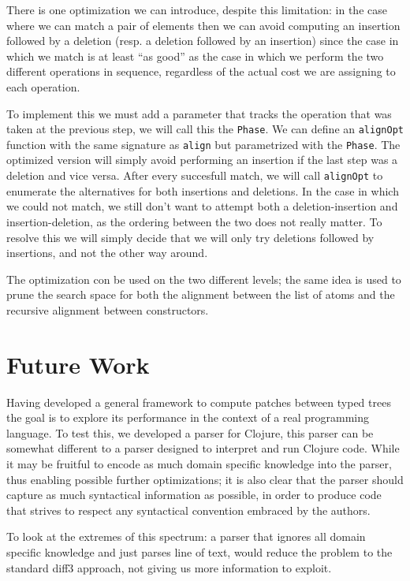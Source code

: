 \documentclass[11pt]{article}
\begin{document}
There is one optimization we can introduce, despite this limitation: in
the case where we can match a pair of elements then we can avoid
computing an insertion followed by a deletion (resp. a deletion followed
by an insertion) since the case in which we match is at least ``as
good'' as the case in which we perform the two different operations in
sequence, regardless of the actual cost we are assigning to each
operation.

To implement this we must add a parameter that tracks the operation that
was taken at the previous step, we will call this the \texttt{Phase}. We
can define an \texttt{alignOpt} function with the same signature as
\texttt{align} but parametrized with the \texttt{Phase}. The optimized
version will simply avoid performing an insertion if the last step was a
deletion and vice versa. 
After every succesfull match, we will call \texttt{alignOpt} to enumerate the alternatives for both insertions and
deletions. In the case in which we could not match, we still don't 
want to attempt both a deletion-insertion and insertion-deletion, as the 
ordering between the two does not really matter. To resolve this we will simply 
decide that we will only try deletions followed by insertions, and not the other 
way around.

The optimization con be used on the two different levels; the same idea is used to prune the search space 
for both the alignment between the list of atoms and the recursive alignment between constructors.


\section{Future Work}\label{future work}

Having developed a general framework to compute patches between typed trees the 
goal is to explore its performance in the context of a real programming 
language.
To test this, we developed a parser for Clojure, this parser can be somewhat 
different to a parser designed to interpret and run Clojure code. While it may 
be fruitful to encode as much domain specific knowledge into the parser, thus 
enabling possible further optimizations; it is also clear that the parser should 
capture as much syntactical information as possible, in order to produce code 
that strives to respect any syntactical convention embraced by the authors.

To look at the extremes of this spectrum: a parser that ignores all domain
specific knowledge and just parses line of text, would reduce the problem to the 
standard diff3 approach, not giving us more information to exploit.
\end{document}
